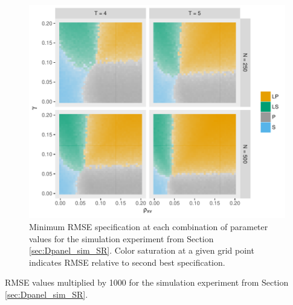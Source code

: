 \begin{figure}[htbp]
\centering
\includegraphics[scale = 0.8]{./simulations/DynamicPanel/results/Dpanel_oracle}
\caption{Minimum RMSE specification at each combination of parameter values for the simulation experiment from Section \ref{sec:Dpanel_sim_SR}. Color saturation at a given grid point indicates RMSE relative to second best specification.}
\label{fig:best}
\end{figure}
\begin{table}
  \footnotesize
  \centering
  

  \vspace{2em}
  
  \caption{RMSE values multiplied by 1000 for the simulation experiment from Section \ref{sec:Dpanel_sim_SR}.}
  \label{tab:Dpanel_RMSE}
\end{table}

